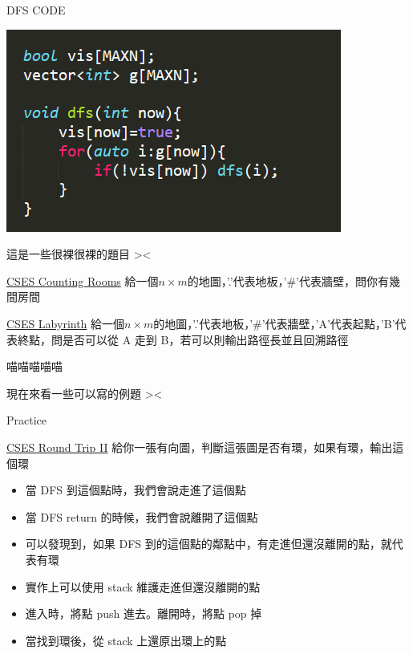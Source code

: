 \documentclass[aspectratio=169]{beamer}
\begin{document}
    \begin{frame}{DFS CODE}
        \begin{center}
            \includegraphics[scale=0.7]{code/dfs_code.png}
        \end{center}
    \end{frame}
    
    \begin{frame}{這是一些很裸很裸的題目 ><}
        \begin{block}{\href{https://cses.fi/problemset/task/1192}{CSES Counting Rooms}}
        給一個$n\times m$的地圖，'.'代表地板，'\#'代表牆壁，問你有幾間房間
        \end{block}
        \begin{block}{\href{https://cses.fi/problemset/task/1193}{CSES Labyrinth}}
        給一個$n\times m$的地圖，'.'代表地板，'\#'代表牆壁，'A'代表起點，'B'代表終點，問是否可以從 A 走到 B，若可以則輸出路徑長並且回溯路徑
        \end{block}
    \end{frame}
    \begin{frame}{喵喵喵喵喵}
        \begin{center}
            現在來看一些可以寫的例題 ><
        \end{center}
    \end{frame}
    \begin{frame}{Practice}
        \begin{block}{\href{https://cses.fi/problemset/task/1678}{CSES Round Trip II}}
        給你一張有向圖，判斷這張圖是否有環，如果有環，輸出這個環
        \end{block} 
        \begin{itemize}
            \item<2-> 當 DFS 到這個點時，我們會說走進了這個點
            \item<2-> 當 DFS return 的時候，我們會說離開了這個點
            \item<3-> 可以發現到，如果 DFS 到的這個點的鄰點中，有走進但還沒離開的點，就代表有環
            \item<4-> 實作上可以使用 stack 維護走進但還沒離開的點
            \item<4-> 進入時，將點 push 進去。離開時，將點 pop 掉
            \item<5-> 當找到環後，從 stack 上還原出環上的點
        \end{itemize}
    \end{frame}
    
\end{document}
